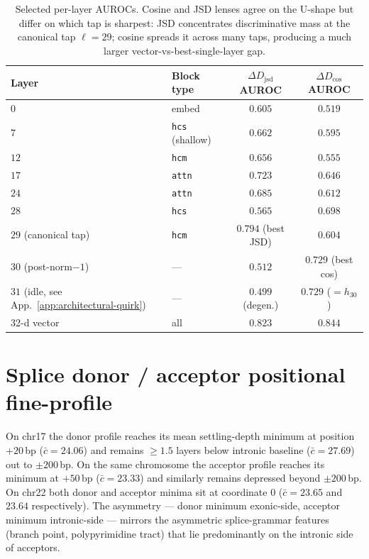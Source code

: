 \documentclass{article}
\theoremstyle{plain}
\theoremstyle{definition}
\theoremstyle{remark}
\newcommand{\DDcos}{\Delta D_{\cos}}
\newcommand{\DDjsd}{\Delta D_{\mathrm{jsd}}}
\begin{document}
\begin{table}[h]
\caption{Selected per-layer AUROCs. Cosine and JSD lenses agree on the
U-shape but differ on which tap is sharpest: JSD concentrates
discriminative mass at the canonical tap $\ell=29$; cosine spreads it
across many taps, producing a much larger vector-vs-best-single-layer
gap.}
\label{tab:per-layer}
\centering
\small
\begin{tabular}{@{}llcc@{}}
\toprule
Layer & Block type & $\DDjsd$ AUROC & $\DDcos$ AUROC \\
\midrule
$0$  & embed                    & $0.605$ & $0.519$ \\
$7$  & \texttt{hcs} (shallow)   & $0.662$ & $0.595$ \\
$12$ & \texttt{hcm}             & $0.656$ & $0.555$ \\
$17$ & \texttt{attn}            & $0.723$ & $0.646$ \\
$24$ & \texttt{attn}            & $0.685$ & $0.612$ \\
$28$ & \texttt{hcs}             & $0.565$ & $0.698$ \\
$29$ (canonical tap) & \texttt{hcm}
                                & $\mathbf{0.794}$ (best JSD) & $0.604$ \\
$30$ (post-norm$-1$)  & ---     & $0.512$ & $\mathbf{0.729}$ (best cos) \\
$31$ (idle, see App.~\ref{app:architectural-quirk}) & ---
                                & $0.499$ (degen.) & $0.729$ ($=h_{30}$) \\
\midrule
32-d vector & all                 & $0.823$ & $0.844$ \\
\bottomrule
\end{tabular}
\end{table}

\section{Splice donor / acceptor positional fine-profile}
\label{app:splice-fine}

On chr17 the donor profile reaches its mean settling-depth minimum at
position $+20$\,bp ($\bar c = 24.06$) and remains $\ge 1.5$ layers
below intronic baseline ($\bar c = 27.69$) out to $\pm 200$\,bp. On
the same chromosome the acceptor profile reaches its minimum at
$+50$\,bp ($\bar c = 23.33$) and similarly remains depressed beyond
$\pm 200$\,bp. On chr22 both donor and acceptor minima sit at coordinate
$0$ ($\bar c = 23.65$ and $23.64$ respectively). The asymmetry --- donor
minimum exonic-side, acceptor minimum intronic-side --- mirrors the
asymmetric splice-grammar features (branch point, polypyrimidine tract)
that lie predominantly on the intronic side of acceptors.
\end{document}
